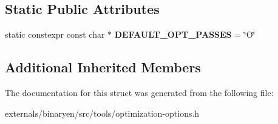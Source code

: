 \subsection*{Static Public Attributes}
\begin{DoxyCompactItemize}
\item 
\mbox{\label{structwasm_1_1_optimization_options_a7fa0a2a96bd4d6b33c5984f66ea27aea}} 
static constexpr const char $\ast$ {\bfseries D\+E\+F\+A\+U\+L\+T\+\_\+\+O\+P\+T\+\_\+\+P\+A\+S\+S\+ES} = \char`\"{}O\char`\"{}
\end{DoxyCompactItemize}
\subsection*{Additional Inherited Members}


The documentation for this struct was generated from the following file\+:\begin{DoxyCompactItemize}
\item 
externals/binaryen/src/tools/optimization-\/options.\+h\end{DoxyCompactItemize}
